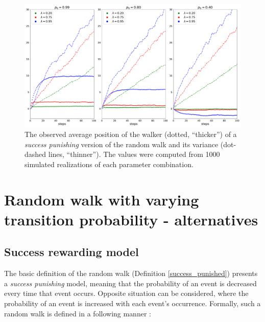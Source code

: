 \documentclass{amsart}
\theoremstyle{definition}
\theoremstyle{plain}
\theoremstyle{plain}
\theoremstyle{plain}
\numberwithin{equation}{section}
\begin{document}
    \begin{figure}
        \begin{center}
            \includegraphics[width=1\textwidth]{../simulations/e_position_1000_walks_100_steps_type_success_punished}
            \caption{\label{fig:position-punished}The observed
            average position of the walker (dotted, ``thicker'')
                of a \emph{success punishing} version of the random walk and its variance (dot-dashed lines, ``thinner''). The values were
                computed from 1000 simulated realizations of each parameter combination.}
        \end{center}
    \end{figure}


    \section{Random walk with varying transition probability - alternatives\label{sec:Random-walk-aternatives}}

    \subsection{Success rewarding model}

    The basic definition of the random walk (Definition \ref{success_punished})
    presents a \emph{success punishing} model, meaning that the probability
    of an event is decreased every time that event occurs. Opposite situation
    can be considered, where the probability of an event is increased
    with each event's occurrence. Formally, such a random walk is defined
    in a following manner \cite{ja2019teze}:
\end{document}
